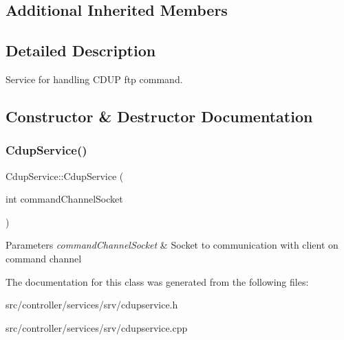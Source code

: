 \subsection*{Additional Inherited Members}


\subsection{Detailed Description}
Service for handling C\+D\+UP ftp command. 

\subsection{Constructor \& Destructor Documentation}
\mbox{\label{classCdupService_ae8c9f05507b10e66af7f73a8cdf3236b}} 
\subsubsection{\texorpdfstring{Cdup\+Service()}{CdupService()}}
{\footnotesize\ttfamily Cdup\+Service\+::\+Cdup\+Service (\begin{DoxyParamCaption}\item[{int}]{command\+Channel\+Socket }\end{DoxyParamCaption})}


\begin{DoxyParams}{Parameters}
{\em command\+Channel\+Socket} & Socket to communication with client on command channel \\
\hline
\end{DoxyParams}


The documentation for this class was generated from the following files\+:\begin{DoxyCompactItemize}
\item 
src/controller/services/srv/cdupservice.\+h\item 
src/controller/services/srv/cdupservice.\+cpp\end{DoxyCompactItemize}
